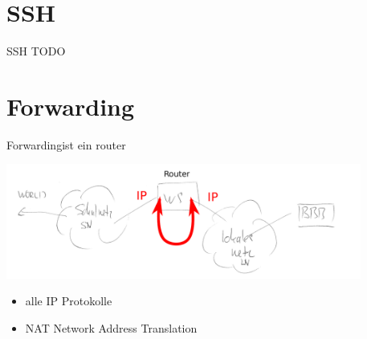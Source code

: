 \documentclass{beamer}
\begin{document}


\section{SSH}
\begin{frame}{\target}{SSH TODO}
\end{frame}

\section{Forwarding}
\begin{frame}{Forwarding}{\host ist ein router}
 \begin{center}
  \includegraphics[width=0.875\textwidth]{router.pdf}
 \end{center}
 \begin{itemize}
  \item alle IP Protokolle 
  \item NAT Network Address Translation
 \end{itemize}
\end{frame}
\end{document}
